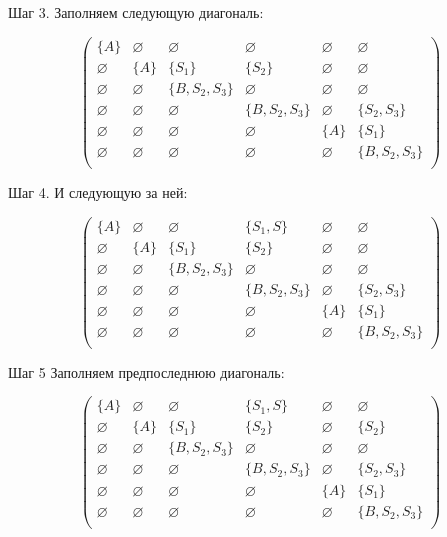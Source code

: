 \begin{example}
Шаг 3. Заполняем следующую диагональ:

\[
\begin{pmatrix}
\{A\}  		& \varnothing & \varnothing    & \varnothing 	  & \varnothing & \varnothing 	 \\
\varnothing & \{A\} 	  & \{S_1\}  		   & \{S_2\}  		  & \varnothing & \varnothing 	 \\
\varnothing & \varnothing & \{B, S_2, S_3\} & \varnothing 	  & \varnothing & \varnothing 	 \\
\varnothing & \varnothing & \varnothing    & \{B, S_2, S_3\}   & \varnothing & \{S_2, S_3\}	 \\
\varnothing & \varnothing & \varnothing    & \varnothing 	  & \{A\} 	    & \{S_1\}	 		 \\
\varnothing & \varnothing & \varnothing    & \varnothing 	  & \varnothing & \{B, S_2, S_3\} \\
\end{pmatrix}
\]

Шаг 4. И следующую за ней:

\[
\begin{pmatrix}
\{A\}  		& \varnothing & \varnothing    & \{S_1, S\}	 	  & \varnothing & \varnothing 	 \\
\varnothing & \{A\} 	  & \{S_1\}  		   & \{S_2\}  		  & \varnothing & \varnothing 	 \\
\varnothing & \varnothing & \{B, S_2, S_3\} & \varnothing 	  & \varnothing & \varnothing 	 \\
\varnothing & \varnothing & \varnothing    & \{B, S_2, S_3\}   & \varnothing & \{S_2, S_3\}	 \\
\varnothing & \varnothing & \varnothing    & \varnothing 	  & \{A\} 	    & \{S_1\}	 		 \\
\varnothing & \varnothing & \varnothing    & \varnothing 	  & \varnothing & \{B, S_2, S_3\} \\
\end{pmatrix}
\]

Шаг 5 Заполняем предпоследнюю диагональ:

\[
\begin{pmatrix}
\{A\}  		& \varnothing & \varnothing    & \{S_1, S\}	 	  & \varnothing & \varnothing 	 \\
\varnothing & \{A\} 	  & \{S_1\}  		   & \{S_2\}  		  & \varnothing & \{S_2\}	 	 \\
\varnothing & \varnothing & \{B, S_2, S_3\} & \varnothing 	  & \varnothing & \varnothing 	 \\
\varnothing & \varnothing & \varnothing    & \{B, S_2, S_3\}   & \varnothing & \{S_2, S_3\}	 \\
\varnothing & \varnothing & \varnothing    & \varnothing 	  & \{A\} 	    & \{S_1\}	 		 \\
\varnothing & \varnothing & \varnothing    & \varnothing 	  & \varnothing & \{B, S_2, S_3\} \\
\end{pmatrix}
\]


\end{example}
